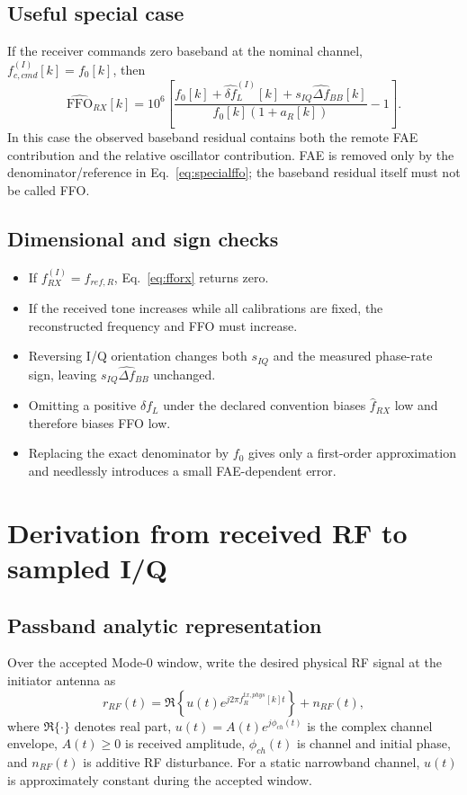 \documentclass[10pt,a4paper]{article}
\newcommand{\FFO}{\mathrm{FFO}}
\begin{document}
\subsection{Useful special case}
If the receiver commands zero baseband at the nominal channel, $f_{c,cmd}^{(I)}[k]=f_0[k]$, then
\begin{equation}
\widehat{\FFO}_{RX}[k]=10^6\left[
\frac{f_0[k]+\widehat{\delta f}_L^{(I)}[k]+s_{IQ}\widehat{\Delta f}_{BB}[k]}
{f_0[k](1+a_R[k])}-1\right].
\label{eq:specialffo}
\end{equation}
In this case the observed baseband residual contains both the remote FAE contribution and the relative oscillator contribution. FAE is removed only by the denominator/reference in Eq.~\ref{eq:specialffo}; the baseband residual itself must not be called FFO.

\subsection{Dimensional and sign checks}
\begin{itemize}
\item If $f_{RX}^{(I)}=f_{ref,R}$, Eq.~\ref{eq:fforx} returns zero.
\item If the received tone increases while all calibrations are fixed, the reconstructed frequency and FFO must increase.
\item Reversing I/Q orientation changes both $s_{IQ}$ and the measured phase-rate sign, leaving $s_{IQ}\widehat{\Delta f}_{BB}$ unchanged.
\item Omitting a positive $\delta f_L$ under the declared convention biases $\widehat f_{RX}$ low and therefore biases FFO low.
\item Replacing the exact denominator by $f_0$ gives only a first-order approximation and needlessly introduces a small FAE-dependent error.
\end{itemize}

\clearpage
\section{Derivation from received RF to sampled I/Q}
\label{sec:rf2iq}
\subsection{Passband analytic representation}
Over the accepted Mode-0 window, write the desired physical RF signal at the initiator antenna as
\begin{equation}
r_{RF}(t)=\Re\left\{u(t)e^{j2\pi f_R^{tx,phys}[k]t}\right\}+n_{RF}(t),
\label{eq:passband}
\end{equation}
where $\Re\{\cdot\}$ denotes real part, $u(t)=A(t)e^{j\phi_{ch}(t)}$ is the complex channel envelope, $A(t)\ge0$ is received amplitude, $\phi_{ch}(t)$ is channel and initial phase, and $n_{RF}(t)$ is additive RF disturbance. For a static narrowband channel, $u(t)$ is approximately constant during the accepted window.
\end{document}
